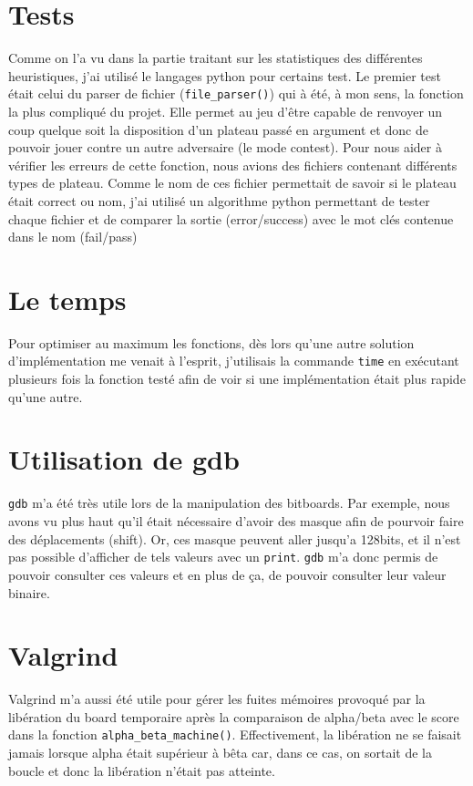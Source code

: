 \documentclass{report}
\begin{document}
\section{Tests}
Comme on l'a vu dans la partie traitant sur les statistiques des différentes heuristiques, j'ai utilisé le langages python pour certains test. Le premier test était celui du parser de fichier (\texttt{file\_parser()}) qui à été, à mon sens, la fonction la plus compliqué du projet. Elle permet au jeu d'être capable de renvoyer un coup quelque soit la disposition d'un plateau passé en argument et donc de pouvoir jouer contre un autre adversaire (le mode contest). Pour nous aider à vérifier les erreurs de cette fonction, nous avions des fichiers contenant différents types de plateau. Comme le nom de ces fichier permettait de savoir si le plateau était correct ou nom, j'ai utilisé un algorithme python permettant de tester chaque fichier et de comparer la sortie (error/success) avec le mot clés contenue dans le nom (fail/pass)

\section{Le temps}
Pour optimiser au maximum les fonctions, dès lors qu'une autre solution d'implémentation me venait à l'esprit, j'utilisais la commande \texttt{time} en exécutant plusieurs fois la fonction testé afin de voir si une implémentation était plus rapide qu'une autre.

\section{Utilisation de gdb}
\texttt{gdb} m'a été très utile lors de la manipulation des bitboards. Par exemple, nous avons vu plus haut qu'il était nécessaire d'avoir des masque afin de pourvoir faire des déplacements (shift). Or, ces masque peuvent aller jusqu'a 128bits, et il n'est pas possible d'afficher de tels valeurs avec un \texttt{print}. \texttt{gdb} m'a donc permis de pouvoir consulter ces valeurs et en plus de ça, de pouvoir consulter leur valeur binaire.


\section{Valgrind}
Valgrind m'a aussi été utile pour gérer les fuites mémoires provoqué par la libération du board temporaire après la comparaison de alpha/beta avec le score dans la fonction \texttt{alpha\_beta\_machine()}. Effectivement, la libération ne se faisait jamais lorsque alpha était supérieur à bêta car, dans ce cas, on sortait de la boucle et donc la libération n'était pas atteinte.
\end{document}
